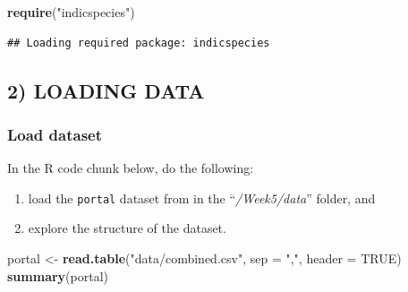 \documentclass[]{article}
\newenvironment{Shaded}{\begin{snugshade}}{\end{snugshade}}
\newcommand{\KeywordTok}[1]{\textcolor[rgb]{0.13,0.29,0.53}{\textbf{{#1}}}}
\newcommand{\DataTypeTok}[1]{\textcolor[rgb]{0.13,0.29,0.53}{{#1}}}
\newcommand{\StringTok}[1]{\textcolor[rgb]{0.31,0.60,0.02}{{#1}}}
\newcommand{\OtherTok}[1]{\textcolor[rgb]{0.56,0.35,0.01}{{#1}}}
\newcommand{\NormalTok}[1]{{#1}}
\providecommand{\tightlist}{%
  \setlength{\itemsep}{0pt}\setlength{\parskip}{0pt}}
\begin{document}
\begin{Shaded}
\begin{Highlighting}[]
\KeywordTok{require}\NormalTok{(}\StringTok{"indicspecies"}\NormalTok{)}
\end{Highlighting}
\end{Shaded}

\begin{verbatim}
## Loading required package: indicspecies
\end{verbatim}

\subsection{2) LOADING DATA}\label{loading-data}

\subsubsection{Load dataset}\label{load-dataset}

In the R code chunk below, do the following:

\begin{enumerate}
\def\labelenumi{\arabic{enumi}.}
\tightlist
\item
  load the \texttt{portal} dataset from in the ``\emph{/Week5/data}''
  folder, and
\item
  explore the structure of the dataset.
\end{enumerate}

\begin{Shaded}
\begin{Highlighting}[]
\NormalTok{portal <-}\StringTok{ }\KeywordTok{read.table}\NormalTok{(}\StringTok{"data/combined.csv"}\NormalTok{, }\DataTypeTok{sep =} \StringTok{","}\NormalTok{, }\DataTypeTok{header =} \OtherTok{TRUE}\NormalTok{)}
\KeywordTok{summary}\NormalTok{(portal)}
\end{Highlighting}
\end{Shaded}
\end{document}
